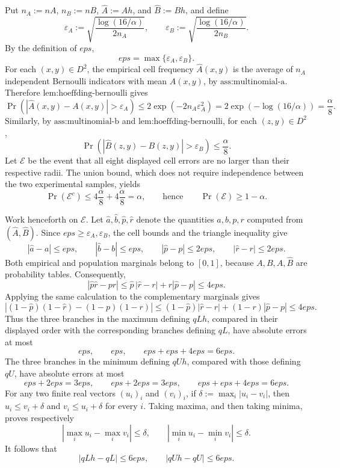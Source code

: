 Put \(n_A:=nA\), \(n_B:=nB\), \(\widehat A:=Ah\), and \(\widehat B:=Bh\), and define
\[
 \varepsilon_A:=\sqrt{\frac{\log(16/\alpha)}{2n_A}},
 \qquad
 \varepsilon_B:=\sqrt{\frac{\log(16/\alpha)}{2n_B}}.
\]
By the definition of \(eps\),
\[
 eps=\max\{\varepsilon_A,\varepsilon_B\}.
\]
For each \((x,y)\in D^2\), the empirical cell frequency \(\widehat A(x,y)\) is the average of \(n_A\) independent Bernoulli indicators with mean \(A(x,y)\), by \(\text{ass:multinomial-a}\).  Therefore \(\text{lem:hoeffding-bernoulli}\) gives
\[
 \Pr\!\left(\left|\widehat A(x,y)-A(x,y)\right|>\varepsilon_A\right)
 \le 2\exp(-2n_A\varepsilon_A^2)
 =2\exp\!\left(-\log(16/\alpha)\right)
 =\frac{\alpha}{8}.
\]
Similarly, by \(\text{ass:multinomial-b}\) and \(\text{lem:hoeffding-bernoulli}\), for each \((z,y)\in D^2\),
\[
 \Pr\!\left(\left|\widehat B(z,y)-B(z,y)\right|>\varepsilon_B\right)
 \le \frac{\alpha}{8}.
\]
Let \(\mathcal E\) be the event that all eight displayed cell errors are no larger than their respective radii.  The union bound, which does not require independence between the two experimental samples, yields
\[
 \Pr(\mathcal E^c)
 \le 4\frac{\alpha}{8}+4\frac{\alpha}{8}
 =\alpha,
 \qquad\text{hence}\qquad
 \Pr(\mathcal E)\ge 1-\alpha.
\]

Work henceforth on \(\mathcal E\).  Let \(\widehat a,\widehat b,\widehat p,\widehat r\) denote the quantities \(a,b,p,r\) computed from \((\widehat A,\widehat B)\).  Since \(eps\ge\varepsilon_A,\varepsilon_B\), the cell bounds and the triangle inequality give
\[
 |\widehat a-a|\le eps,
 \qquad
 |\widehat b-b|\le eps,
 \qquad
 |\widehat p-p|\le 2eps,
 \qquad
 |\widehat r-r|\le 2eps.
\]
Both empirical and population marginals belong to \([0,1]\), because \(A,B,\widehat A,\widehat B\) are probability tables.  Consequently,
\[
 |\widehat p\widehat r-pr|
 \le \widehat p\,|\widehat r-r|+r|\widehat p-p|
 \le 4eps.
\]
Applying the same calculation to the complementary marginals gives
\[
 |(1-\widehat p)(1-\widehat r)-(1-p)(1-r)|
 \le (1-\widehat p)|\widehat r-r|+(1-r)|\widehat p-p|
 \le 4eps.
\]
Thus the three branches in the maximum defining \(qLh\), compared in their displayed order with the corresponding branches defining \(qL\), have absolute errors at most
\[
 eps,\qquad eps,\qquad eps+eps+4eps=6eps.
\]
The three branches in the minimum defining \(qUh\), compared with those defining \(qU\), have absolute errors at most
\[
 eps+2eps=3eps,\qquad eps+2eps=3eps,\qquad eps+eps+4eps=6eps.
\]
For any two finite real vectors \((u_i)_i\) and \((v_i)_i\), if \(\delta:=\max_i|u_i-v_i|\), then \(u_i\le v_i+\delta\) and \(v_i\le u_i+\delta\) for every \(i\).  Taking maxima, and then taking minima, proves respectively
\[
 \left|\max_i u_i-\max_i v_i\right|\le\delta,
 \qquad
 \left|\min_i u_i-\min_i v_i\right|\le\delta.
\]
It follows that
\[
 |qLh-qL|\le 6eps,
 \qquad
 |qUh-qU|\le 6eps.
\]

